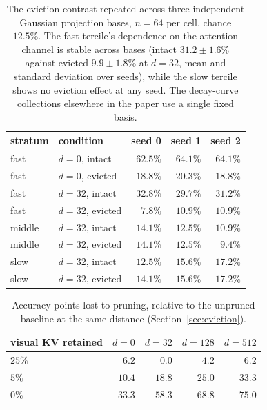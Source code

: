 \begin{table}[h]
\centering\small
\begin{tabular}{llrrr}
\toprule
stratum & condition & seed 0 & seed 1 & seed 2 \\
\midrule
fast   & $d{=}0$, intact       & $62.5\%$ & $64.1\%$ & $64.1\%$ \\
fast   & $d{=}0$, evicted      & $18.8\%$ & $20.3\%$ & $18.8\%$ \\
fast   & $d{=}32$, intact      & $32.8\%$ & $29.7\%$ & $31.2\%$ \\
fast   & $d{=}32$, evicted     & $7.8\%$  & $10.9\%$ & $10.9\%$ \\
\addlinespace
middle & $d{=}32$, intact      & $14.1\%$ & $12.5\%$ & $10.9\%$ \\
middle & $d{=}32$, evicted     & $14.1\%$ & $12.5\%$ & $9.4\%$  \\
\addlinespace
slow   & $d{=}32$, intact      & $12.5\%$ & $15.6\%$ & $17.2\%$ \\
slow   & $d{=}32$, evicted     & $14.1\%$ & $15.6\%$ & $17.2\%$ \\
\bottomrule
\end{tabular}
\caption{The eviction contrast repeated across three independent Gaussian
projection bases, $n = 64$ per cell, chance $12.5\%$. The fast tercile's
dependence on the attention channel is stable across bases (intact
$31.2 \pm 1.6\%$ against evicted $9.9 \pm 1.8\%$ at $d{=}32$, mean and standard
deviation over seeds), while the slow tercile shows no eviction effect at any
seed. The decay-curve collections elsewhere in the paper use a single fixed
basis.}
\label{tab:seeds}
\end{table}

\begin{table}[h]
\centering\small
\begin{tabular}{lrrrr}
\toprule
visual KV retained & $d{=}0$ & $d{=}32$ & $d{=}128$ & $d{=}512$ \\
\midrule
$25\%$ & $6.2$  & $0.0$  & $4.2$  & $6.2$ \\
$5\%$  & $10.4$ & $18.8$ & $25.0$ & $33.3$ \\
$0\%$  & $33.3$ & $58.3$ & $68.8$ & $75.0$ \\
\bottomrule
\end{tabular}
\caption{Accuracy points lost to pruning, relative to the unpruned baseline at
the same distance (Section~\ref{sec:eviction}).}
\label{tab:eviction_cost}
\end{table}

